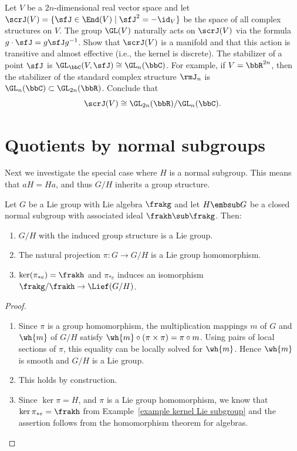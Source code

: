 \begin{xca}
    Let $V$ be a $2n$-dimensional real vector space and let $\scrJ(V)=\{\sfJ\in\End(V)\mid \sfJ^2=-\id_V\}$ be the space of all complex structures on $V$. The group $\GL(V)$ naturally acts on $\scrJ(V)$ via the formula $g\cdot \sfJ=g\sfJ g^{-1}$. Show that $\scrJ(V)$ is a manifold and that this action is transitive and almost effective (i.e., the kernel is discrete). The stabilizer of a point $\sfJ$ is $\GL_\bbC(V,\sfJ)\cong \GL_n(\bbC)$. For example, if $V=\bbR^{2n}$, then the stabilizer of the standard complex structure $\rmJ_n$ is $\GL_n(\bbC)\subset\GL_{2n}(\bbR)$. Conclude that
    \[\scrJ(V)\cong \GL_{2n}(\bbR)\slash \GL_n(\bbC).\]
\end{xca}









\section{Quotients by normal subgroups}

Next we investigate the special case where $H$ is a normal subgroup. This means that $aH=Ha$, and thus $G\slash H$ inherits a group structure. 

\begin{prop}\label{prop quotient group}
    Let $G$ be a Lie group with Lie algebra $\frakg$ and let $H\embsub G$ be a closed normal subgroup with associated ideal $\frakh\sub \frakg$. Then:
    \begin{enumerate}
        \item $G\slash H$ with the induced group structure is a Lie group.
        \item The natural projection $\pi: G\to G\slash H$ is a Lie group homomorphism.
        \item $\ker(\pi_{\ast e})=\frakh$ and $\pi_{\ast e}$ induces an isomorphism $\frakg\slash \frakh\to \Lief (G\slash H)$.
    \end{enumerate}
\end{prop}
\begin{proof}
    \begin{enumerate}
        \item Since $\pi$ is a group homomorphism, the multiplication mappings $m$ of $G$ and $\wh{m}$ of $G\slash H$ satisfy $\wh{m}\circ(\pi\times \pi)=\pi\circ m$. Using pairs of local sections of $\pi$, this equality can be locally solved for $\wh{m}$. Hence $\wh{m}$ is smooth and $G\slash H$ is a Lie group.
        \item This holds by construction.
        \item Since $\ker \pi=H$, and $\pi$ is a Lie group homomorphism, we know that $\ker \pi_{\ast e}=\frakh$ from Example~\ref{example kernel Lie subgroup} and the assertion follows from the homomorphism theorem for algebras.
    \end{enumerate}
\end{proof}

